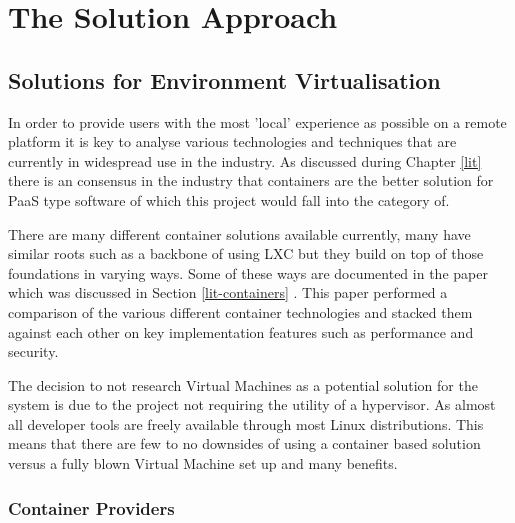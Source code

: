 \chapter{The Solution Approach} \label{solapp}

\section{Solutions for Environment Virtualisation} \label{subapp-virt}
In order to provide users with the most 'local' experience as possible on a remote platform it is key to analyse various technologies and techniques that are currently in widespread use in the industry. As discussed during Chapter \ref{lit} there is an consensus in the industry that containers are the better solution for PaaS type software of which this project would fall into the category of.

There are many different container solutions available currently, many have similar roots such as a backbone of using LXC but they build on top of those foundations in varying ways. Some of these ways are documented in the paper which was discussed in Section \ref{lit-containers} \cite{contsvsvirt}. This paper performed a comparison of the various different container technologies and stacked them against each other on key implementation features such as performance and security.

The decision to not research Virtual Machines as a potential solution for the system is due to the project not requiring the utility of a hypervisor. As almost all developer tools are freely available through most Linux distributions. This means that there are few to no downsides of using a container based solution versus a fully blown Virtual Machine set up and many benefits.

\subsection{Container Providers} 

